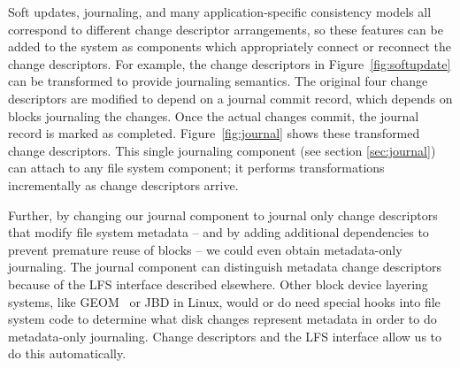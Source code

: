 Soft updates, journaling, and many application-specific consistency models all
correspond to different change descriptor arrangements, so these features can be
added to the system as components which appropriately connect or reconnect the
change descriptors. For example, the change descriptors in
Figure~\ref{fig:softupdate} can be transformed to provide journaling semantics.
The original four change descriptors are modified to depend on a journal commit
record, which depends on blocks journaling the changes. Once the actual changes
commit, the journal record is marked as completed. Figure~\ref{fig:journal}
shows these transformed change descriptors. This single journaling component
(see section \ref{sec:journal}) can attach to any file system component; it
performs transformations incrementally as change descriptors arrive.

Further, by changing our journal component to journal only change descriptors
that modify file system metadata -- and by adding additional dependencies to
prevent premature reuse of blocks -- we could even obtain metadata-only
journaling. The journal component can distinguish metadata change descriptors
because of the LFS interface described elsewhere. Other block device layering
systems, like GEOM~\cite{geom} or JBD in Linux, would or do need special hooks
into file system code to determine what disk changes represent metadata in order
to do metadata-only journaling. Change descriptors and the LFS interface allow
us to do this automatically.
